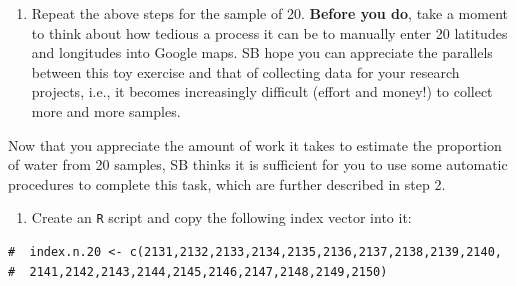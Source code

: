 \documentclass[letterpaper,12pt,twoside,]{pinp}
\providecommand{\tightlist}{%
  \setlength{\itemsep}{0pt}\setlength{\parskip}{0pt}}
\begin{document}
\begin{enumerate}
\def\labelenumi{\arabic{enumi}.}
\tightlist
\item
  Repeat the above steps for the sample of 20. \textbf{Before you do},
  take a moment to think about how tedious a process it can be to
  manually enter 20 latitudes and longitudes into Google maps. SB hope
  you can appreciate the parallels between this toy exercise and that of
  collecting data for your research projects, i.e., it becomes
  increasingly difficult (effort and money!) to collect more and more
  samples.
\end{enumerate}

Now that you appreciate the amount of work it takes to estimate the
proportion of water from 20 samples, SB thinks it is sufficient for you
to use some automatic procedures to complete this task, which are
further described in step 2.

\begin{enumerate}
\def\labelenumi{\arabic{enumi}.}
\setcounter{enumi}{1}
\tightlist
\item
  Create an \texttt{R} script and copy the following index vector into
  it:
\end{enumerate}

\begin{Shaded}
\begin{Highlighting}[]
\StringTok{ }
\NormalTok{(}\NormalTok{(}\NormalTok{,}\NormalTok{,}
                \OperatorTok{$}\NormalTok{ind20[}\OperatorTok{:}\NormalTok{],}
                       \NormalTok{),}\NormalTok{,}\NormalTok{,}
          \OperatorTok{$}\NormalTok{ind20[}\OperatorTok{:}\NormalTok{],}
                       \NormalTok{),}
          \NormalTok{, } \NormalTok{))}
\end{Highlighting}
\end{Shaded}

\begin{ShadedResult}
\begin{verbatim}
#  index.n.20 <- c(2131,2132,2133,2134,2135,2136,2137,2138,2139,2140,
#  2141,2142,2143,2144,2145,2146,2147,2148,2149,2150)
\end{verbatim}
\end{ShadedResult}
\end{document}
